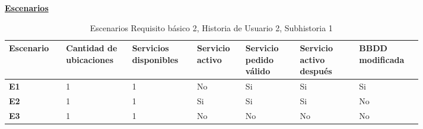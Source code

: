 \documentclass[../ei103948-project-documentation.tex]{subfiles}
\begin{document}
				\begin{center}
					\textbf{\underline{Escenarios}}
					\begin{table}[H]
						\centering
						\begin{tabular}{|p{0.11\linewidth}|p{0.13\linewidth}|p{0.13\linewidth}|p{0.09\linewidth}|p{0.11\linewidth}|p{0.12\linewidth}|p{0.12\linewidth}|}
							\hline
							\textbf{Escenario} & \textbf{Cantidad de ubicaciones} & \textbf{Servicios disponibles} & \textbf{Servicio activo} & \textbf{Servicio pedido válido} & \textbf{Servicio activo después} & \textbf{BBDD modificada} \\ \hline
							\textbf{E1}        & 1                                & 1                              & No                       & Si                              & Si                               & Si                       \\ \hline
							\textbf{E2}        & 1                                & 1                              & Si                       & Si                              & Si                               & No                       \\ \hline
							\textbf{E3}        & 1                                & 1                              & No                       & No                              & No                               & No                       \\ \hline
							\end{tabular}
						\caption{Escenarios Requisito básico 2, Historia de Usuario 2, Subhistoria 1}
					\end{table}

					\descripcionBasicaM


\end{center}
\end{document}
